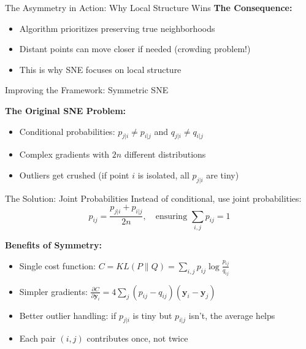 \documentclass[10pt]{beamer}
\begin{document}
\begin{frame}{The Asymmetry in Action: Why Local Structure Wins}
\vspace{0.3cm}
\textbf{The Consequence:}
\begin{itemize}
    \setlength\itemsep{0em}
    \item Algorithm prioritizes preserving true neighborhoods
    \item Distant points can move closer if needed (crowding problem!)
    \item This is why SNE focuses on local structure
\end{itemize}

\end{frame}

\begin{frame}{Improving the Framework: Symmetric SNE}

\textbf{The Original SNE Problem:}
\begin{itemize}
    \setlength\itemsep{0em}
    \item Conditional probabilities: $p_{j|i} \neq p_{i|j}$ and $q_{j|i} \neq q_{i|j}$
    \item Complex gradients with $2n$ different distributions
    \item Outliers get crushed (if point $i$ is isolated, all $p_{j|i}$ are tiny)
\end{itemize}

\vspace{0.15cm}
\begin{block}{The Solution: Joint Probabilities}
Instead of conditional, use joint probabilities:
\begin{equation}
p_{ij} = \frac{p_{j|i} + p_{i|j}}{2n}, \quad \text{ensuring } \sum_{i,j} p_{ij} = 1
\end{equation}
\end{block}

\vspace{0.1cm}
\textbf{Benefits of Symmetry:}
\begin{itemize}
    \setlength\itemsep{0em}
    \item Single cost function: $C = KL(P\|Q) = \sum_{i,j} p_{ij} \log \frac{p_{ij}}{q_{ij}}$
    \item Simpler gradients: $\frac{\partial C}{\partial \mathbf{y}_i} = 4 \sum_j (p_{ij} - q_{ij})(\mathbf{y}_i - \mathbf{y}_j)$
    \item Better outlier handling: if $p_{j|i}$ is tiny but $p_{i|j}$ isn't, the average helps
    \item Each pair $(i,j)$ contributes once, not twice
\end{itemize}


\end{frame}
\end{document}
